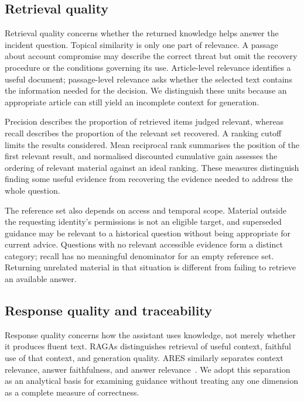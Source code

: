 \subsection{Retrieval quality}

Retrieval quality concerns whether the returned knowledge helps answer the incident question. Topical similarity is only one part of relevance. A passage about account compromise may describe the correct threat but omit the recovery procedure or the conditions governing its use. Article-level relevance identifies a useful document; passage-level relevance asks whether the selected text contains the information needed for the decision. We distinguish these units because an appropriate article can still yield an incomplete context for generation.

Precision describes the proportion of retrieved items judged relevant, whereas recall describes the proportion of the relevant set recovered. A ranking cutoff limits the results considered. Mean reciprocal rank summarises the position of the first relevant result, and normalised discounted cumulative gain assesses the ordering of relevant material against an ideal ranking. These measures distinguish finding some useful evidence from recovering the evidence needed to address the whole question.

The reference set also depends on access and temporal scope. Material outside the requesting identity's permissions is not an eligible target, and superseded guidance may be relevant to a historical question without being appropriate for current advice. Questions with no relevant accessible evidence form a distinct category; recall has no meaningful denominator for an empty reference set. Returning unrelated material in that situation is different from failing to retrieve an available answer.

\subsection{Response quality and traceability}

Response quality concerns how the assistant uses knowledge, not merely whether it produces fluent text. RAGAs distinguishes retrieval of useful context, faithful use of that context, and generation quality. ARES similarly separates context relevance, answer faithfulness, and answer relevance~\cite{ref039,ref040}. We adopt this separation as an analytical basis for examining guidance without treating any one dimension as a complete measure of correctness.

